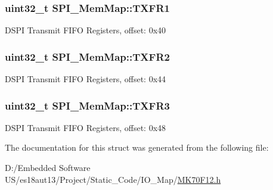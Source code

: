 \subsubsection[{T\+X\+F\+R1}]{\setlength{\rightskip}{0pt plus 5cm}uint32\+\_\+t S\+P\+I\+\_\+\+Mem\+Map\+::\+T\+X\+F\+R1}\label{struct_s_p_i___mem_map_aa4c8bc4c6c43cb03d266084ead4948f6}
D\+S\+P\+I Transmit F\+I\+F\+O Registers, offset\+: 0x40 \hypertarget{struct_s_p_i___mem_map_a2e65235ded22e36d3dae2b17f172a32b}{}
\subsubsection[{T\+X\+F\+R2}]{\setlength{\rightskip}{0pt plus 5cm}uint32\+\_\+t S\+P\+I\+\_\+\+Mem\+Map\+::\+T\+X\+F\+R2}\label{struct_s_p_i___mem_map_a2e65235ded22e36d3dae2b17f172a32b}
D\+S\+P\+I Transmit F\+I\+F\+O Registers, offset\+: 0x44 \hypertarget{struct_s_p_i___mem_map_a817203724ca73f53cc544f887eeabd27}{}
\subsubsection[{T\+X\+F\+R3}]{\setlength{\rightskip}{0pt plus 5cm}uint32\+\_\+t S\+P\+I\+\_\+\+Mem\+Map\+::\+T\+X\+F\+R3}\label{struct_s_p_i___mem_map_a817203724ca73f53cc544f887eeabd27}
D\+S\+P\+I Transmit F\+I\+F\+O Registers, offset\+: 0x48 

The documentation for this struct was generated from the following file\+:\begin{DoxyCompactItemize}
\item 
D\+:/\+Embedded Software U\+S/es18aut13/\+Project/\+Static\+\_\+\+Code/\+I\+O\+\_\+\+Map/\hyperlink{_m_k70_f12_8h}{M\+K70\+F12.\+h}\end{DoxyCompactItemize}
